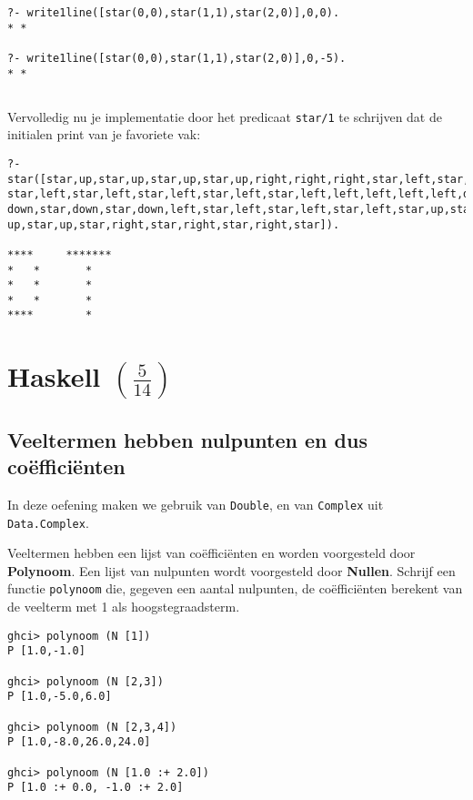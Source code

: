 \documentclass[kulak]{kulakarticle}
\begin{document}
	\begin{verbatim}
?- write1line([star(0,0),star(1,1),star(2,0)],0,0).
* *

?- write1line([star(0,0),star(1,1),star(2,0)],0,-5).
* *\end{verbatim}

	\newpage
	\subsection{}
	Vervolledig nu je implementatie door het predicaat \texttt{star/1} te schrijven dat de initialen print van je favoriete vak:

	\begin{verbatim}
?- star([star,up,star,up,star,up,star,up,right,right,right,star,left,star,left,
star,left,star,left,star,left,star,left,star,left,left,left,left,left,down,star,
down,star,down,star,down,left,star,left,star,left,star,left,star,up,star,up,star,
up,star,up,star,right,star,right,star,right,star]).

****     *******
*   *       *
*   *       *
*   *       *
****        *\end{verbatim}

	\section{Haskell \((\frac{5}{14})\)}

	\subsection{Veeltermen hebben nulpunten en dus coëfficiënten}

	In deze oefening maken we gebruik van \texttt{Double}, en van \texttt{Complex} uit \texttt{Data.Complex}.

	Veeltermen hebben een lijst van coëfficiënten en worden voorgesteld door \textbf{Polynoom}. Een lijst van nulpunten wordt voorgesteld door \textbf{Nullen}. Schrijf een functie \texttt{polynoom} die, gegeven een aantal nulpunten, de coëfficiënten berekent van de veelterm met 1 als hoogstegraadsterm.

	\begin{verbatim}
ghci> polynoom (N [1])
P [1.0,-1.0]

ghci> polynoom (N [2,3])
P [1.0,-5.0,6.0]

ghci> polynoom (N [2,3,4])
P [1.0,-8.0,26.0,24.0]

ghci> polynoom (N [1.0 :+ 2.0])
P [1.0 :+ 0.0, -1.0 :+ 2.0]\end{verbatim}
\end{document}
